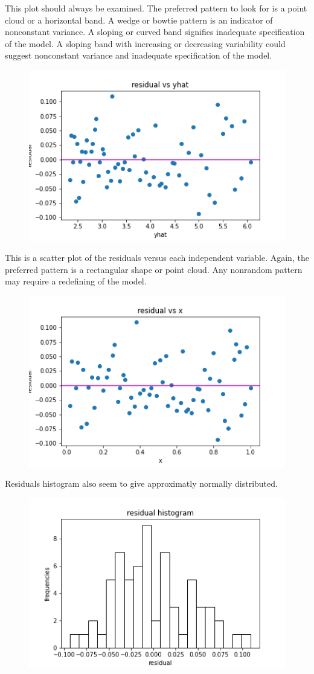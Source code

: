 \documentclass{article}
\begin{document}
This plot should always be examined. The preferred pattern to look for is a point cloud or a horizontal band. A
wedge or bowtie pattern is an indicator of nonconstant variance. A sloping or curved band signifies inadequate
specification of the model. A sloping band with increasing or decreasing variability could suggest nonconstant
variance and inadequate specification of the model.
\begin{figure}[H]
    \includegraphics[]{plots/q6-3.png}
\end{figure}

This is a scatter plot of the residuals versus each independent variable. Again, the preferred pattern is a
rectangular shape or point cloud. Any nonrandom pattern may require a redefining of the model.
\begin{figure}[H]
    \includegraphics[]{plots/q6-4.png}
\end{figure}

Residuals histogram also seem to give approximatly normally distributed.
\begin{figure}[H]
    \includegraphics[]{plots/q6-5.png}
\end{figure}
\end{document}
